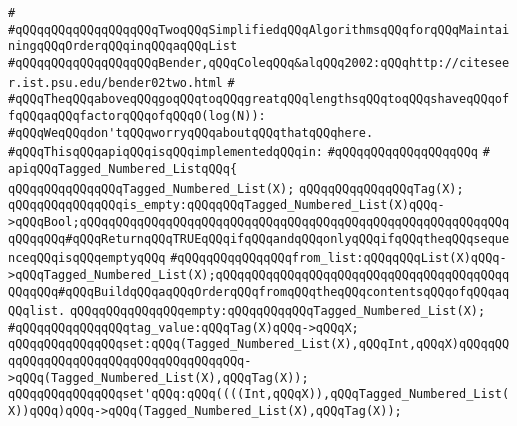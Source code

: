 \verb|#|\newline
\verb|#qQQqqQQqqQQqqQQqqQQqTwoqQQqSimplifiedqQQqAlgorithmsqQQqforqQQqMaintainingqQQqOrderqQQqinqQQqaqQQqList|\newline
\verb|#qQQqqQQqqQQqqQQqqQQqBender,qQQqColeqQQq&alqQQq2002:qQQqhttp://citeseer.ist.psu.edu/bender02two.html|\newline
\verb|#|\newline
\verb|#qQQqTheqQQqaboveqQQqgoqQQqtoqQQqgreatqQQqlengthsqQQqtoqQQqshaveqQQqoffqQQqaqQQqfactorqQQqofqQQqO(log(N)):|\newline
\verb|#qQQqWeqQQqdon'tqQQqworryqQQqaboutqQQqthatqQQqhere.|\newline
\newline
\verb|#qQQqThisqQQqapiqQQqisqQQqimplementedqQQqin:|\newline
\verb|#qQQqqQQqqQQqqQQqqQQq|\newline
\verb|#|\newline
\verb|apiqQQqTagged_Numbered_ListqQQq{|\newline
\newline
\verb|qQQqqQQqqQQqqQQqTagged_Numbered_List(X);|\newline
\verb|qQQqqQQqqQQqqQQqTag(X);|\newline
\newline
\verb|qQQqqQQqqQQqqQQqis_empty:qQQqqQQqTagged_Numbered_List(X)qQQq->qQQqBool;qQQqqQQqqQQqqQQqqQQqqQQqqQQqqQQqqQQqqQQqqQQqqQQqqQQqqQQqqQQqqQQqqQQq#qQQqReturnqQQqTRUEqQQqifqQQqandqQQqonlyqQQqifqQQqtheqQQqsequenceqQQqisqQQqemptyqQQq|\newline
\newline
\verb|#qQQqqQQqqQQqqQQqfrom_list:qQQqqQQqList(X)qQQq->qQQqTagged_Numbered_List(X);qQQqqQQqqQQqqQQqqQQqqQQqqQQqqQQqqQQqqQQqqQQqqQQq#qQQqBuildqQQqaqQQqOrderqQQqfromqQQqtheqQQqcontentsqQQqofqQQqaqQQqlist.|\newline
\newline
\verb|qQQqqQQqqQQqqQQqempty:qQQqqQQqqQQqTagged_Numbered_List(X);|\newline
\newline
\verb|#qQQqqQQqqQQqqQQqtag_value:qQQqTag(X)qQQq->qQQqX;|\newline
\newline
\verb|qQQqqQQqqQQqqQQqset:qQQq(Tagged_Numbered_List(X),qQQqInt,qQQqX)qQQqqQQqqQQqqQQqqQQqqQQqqQQqqQQqqQQqqQQq->qQQq(Tagged_Numbered_List(X),qQQqTag(X));|\newline
\verb|qQQqqQQqqQQqqQQqset'qQQq:qQQq((((Int,qQQqX)),qQQqTagged_Numbered_List(X))qQQq)qQQq->qQQq(Tagged_Numbered_List(X),qQQqTag(X));|\newline
